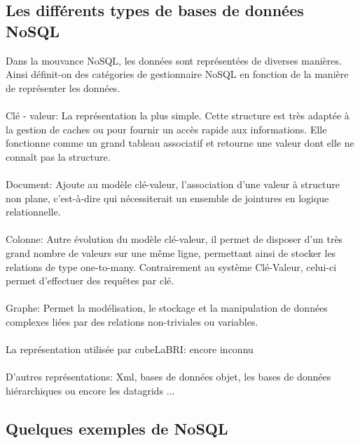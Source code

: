 \subsection{Les différents types de bases de données \textsf{NoSQL}} 
 
Dans la mouvance \textsf{NoSQL}, les données sont représentées de
diverses manières. Ainsi définit-on des catégories de gestionnaire
\textsf{NoSQL} en fonction de la manière de représenter les données.
\\\\ 
\textsf{Clé - valeur}: La représentation la plus simple. Cette
structure est très adaptée à la gestion de caches ou pour fournir un
accès rapide aux informations. Elle fonctionne comme un grand tableau
associatif et retourne une valeur dont elle ne connaît pas la
structure.  
\\\\ 
{\sf Document}: Ajoute au modèle clé-valeur,
l’association d’une valeur à structure non plane, c’est-à-dire qui
nécessiterait un ensemble de jointures en logique relationnelle.
\\\\ 
{\sf Colonne}: Autre évolution du modèle clé-valeur, il permet de
disposer d'un très grand nombre de valeurs sur une même ligne,
permettant ainsi de stocker les relations de type one-to-many.
Contrairement au système Clé-Valeur, celui-ci permet d’effectuer des
requêtes par clé.  
\\\\ 
{\sf Graphe}: Permet la modélisation, le
stockage et la manipulation de données complexes liées par des
relations non-triviales ou variables.  
\\ \\ 
{\sf La représentation utilisée par cubeLaBRI}: encore inconnu 
\\ \\ 
\textsf{D'autres représentations}: \textsf{Xml}, \textsf{bases de données objet},
\textsf{les bases de données hiérarchiques ou encore les datagrids}
...

\subsection{Quelques exemples de \textsf{NoSQL}}

